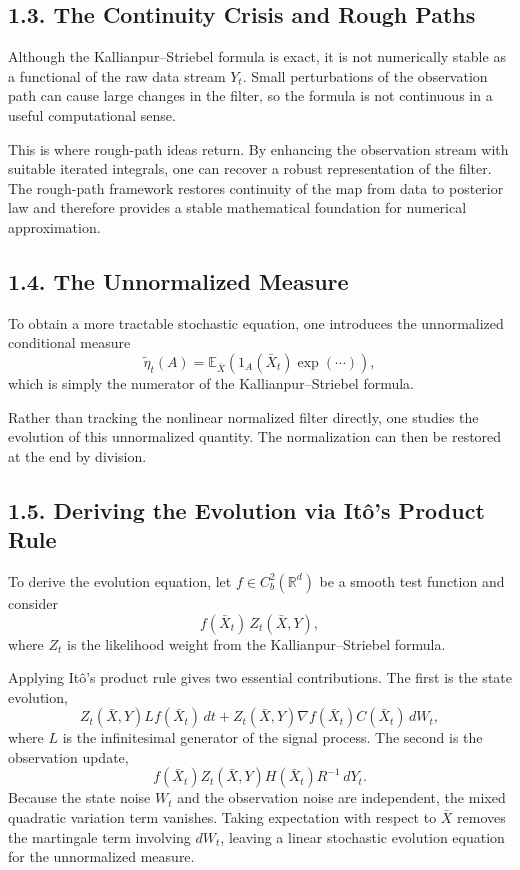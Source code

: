 \documentclass[11pt]{article}
\theoremstyle{definition}
\theoremstyle{remark}
\begin{document}
\subsection*{1.3. The Continuity Crisis and Rough Paths}
Although the Kallianpur--Striebel formula is exact, it is not numerically stable as a functional of the raw data stream \(Y_t\). Small perturbations of the observation path can cause large changes in the filter, so the formula is not continuous in a useful computational sense.

This is where rough-path ideas return. By enhancing the observation stream with suitable iterated integrals, one can recover a robust representation of the filter. The rough-path framework restores continuity of the map from data to posterior law and therefore provides a stable mathematical foundation for numerical approximation.

\subsection*{1.4. The Unnormalized Measure}
To obtain a more tractable stochastic equation, one introduces the unnormalized conditional measure
\[
\widetilde\eta_t(A)
=
\mathbb E_{\bar X}
\left(
1_A(\bar X_t)
\exp(\cdots)
\right),
\]
which is simply the numerator of the Kallianpur--Striebel formula.

Rather than tracking the nonlinear normalized filter directly, one studies the evolution of this unnormalized quantity. The normalization can then be restored at the end by division.

\subsection*{1.5. Deriving the Evolution via It\^o's Product Rule}
To derive the evolution equation, let \(f\in C_b^2(\mathbb R^d)\) be a smooth test function and consider
\[
f(\bar X_t)\,Z_t(\bar X,Y),
\]
where \(Z_t\) is the likelihood weight from the Kallianpur--Striebel formula.

Applying It\^o's product rule gives two essential contributions. The first is the state evolution,
\[
Z_t(\bar X,Y)Lf(\bar X_t)\,dt
+
Z_t(\bar X,Y)\nabla f(\bar X_t)C(\bar X_t)\,dW_t,
\]
where \(L\) is the infinitesimal generator of the signal process. The second is the observation update,
\[
f(\bar X_t)Z_t(\bar X,Y)H(\bar X_t)R^{-1}\,dY_t.
\]
Because the state noise \(W_t\) and the observation noise are independent, the mixed quadratic variation term vanishes. Taking expectation with respect to \(\bar X\) removes the martingale term involving \(dW_t\), leaving a linear stochastic evolution equation for the unnormalized measure.
\end{document}
